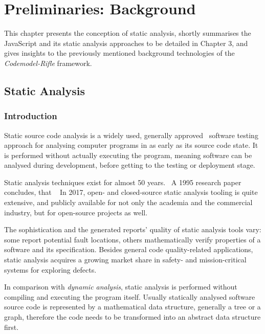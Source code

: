\chapter{Preliminaries: Background}
\label{chapter:background}

This chapter presents the conception of static analysis, shortly summarises the JavaScript and its static analysis approaches to be detailed in Chapter 3, and gives insights to the previously mentioned background technologies of the \emph{Codemodel-Rifle} framework.


\section{Static Analysis}


\subsection{Introduction}

Static source code analysis is a widely used, generally approved~\cite{373902} software testing approach for analysing computer programs in as early as its source code state. It is performed without actually executing the program, meaning software can be analysed during development, before getting to the testing or deployment stage.

Static analysis techniques exist for almost 50 years.~\cite{emanuelsson2008comparative} A 1995 research paper concludes, that ~\cite{373902} In 2017, open- and closed-source static analysis tooling is quite extensive, and publicly available for not only the academia and the commercial industry, but for open-source projects as well.~\cite{wikipedia-static-analysis}

The sophistication and the generated reports' quality of static analysis tools vary: some report potential fault locations, others mathematically verify properties of a software and its specification. Besides general code quality-related applications, static analysis acquires a growing market share in safety- and mission-critical systems for exploring defects.~\cite{livshits2006improving}

In comparison with \emph{dynamic analysis}, static analysis is performed without compiling and executing the program itself. Usually statically analysed software source code is represented by a mathematical data structure, generally a tree or a graph, therefore the code needs to be transformed into an abstract data structure first.


